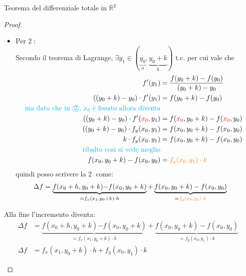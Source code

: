 \documentclass{article}  %
\begin{document}
\begin{theorem}{Teorema del differenziale totale in $\mathbb{R}^2$}
\begin{proof}
\begin{enumerate}
\begin{itemize}
				      \item Per \textcircled{2}: \\
				            Secondo il teorema di Lagrange, $\exists y_1 \in (\underbrace{y_0}_{a}, \underbrace{y_0+k}_{b})$ t.c. per cui vale che
				            \begin{align*}
					            f'(y_1)                                           & = \frac{f(y_0+k)-f(y_0)}{(y_0+k)-y_0}                          \\
					            ((y_0+k)-y_0) \cdot f'(y_1)                       & = f(y_0+k)-f(y_0)                                              \\
					            \textcolor{cyan}{\text{ma dato che in \textcircled{2}, $x_0$ è fissato allora diventa}}                            \\
					            ((y_0+k)-y_0) \cdot f'(\textcolor{red}{x_0}, y_1) & = f(\textcolor{red}{x_0} , y_0+k)-f(\textcolor{red}{x_0}, y_0) \\
					            ((y_0+k)-y_0) \cdot f_y({x_0}, y_1)               & = f({x_0} , y_0+k)-f({x_0}, y_0)                               \\
					            k \cdot f_y({x_0}, y_1)                           & = f({x_0} , y_0+k)-f({x_0}, y_0)                               \\
					            \textcolor{cyan}{\text{ribalto così si vede meglio}}                                                               \\
					            f({x_0} , y_0+k)-f({x_0}, y_0)                    & = \textcolor{orange}{f_y({x_0}, y_1) \cdot k}
				            \end{align*}
				            quindi posso scrivere la \textcircled{2} come:
				            \begin{align*}
					            \Delta f & =\underbrace{f(x_0+h, y_0+k){-f(x_0, y_0+k)}}_{= {f_x(x_1, {y_0+k}) \cdot h}} + \underbrace{{f(x_0, y_0+k)} -f(x_0,y_0)}_{= \textcolor{orange}{f_y({x_0}, y_1) \cdot k}}
				            \end{align*}
			      \end{itemize}
			      Alla fine l'incremento diventa:
			      \begin{align*}
				      \Delta f & =\underbrace{f(x_0+h, y_0+k){-f(x_0, y_0+k)}}_{= {f_x(x_1, {y_0+k}) \cdot h}} + \underbrace{{f(x_0, y_0+k)} -f(x_0,y_0)}_{= {f_y({x_0}, y_1) \cdot k}} \\
				      \Delta f & = f_x(x_1, {y_0+k}) \cdot h + f_y({x_0}, y_1) \cdot k
			      \end{align*}

\end{enumerate}
\end{proof}
\end{theorem}
\end{document}
